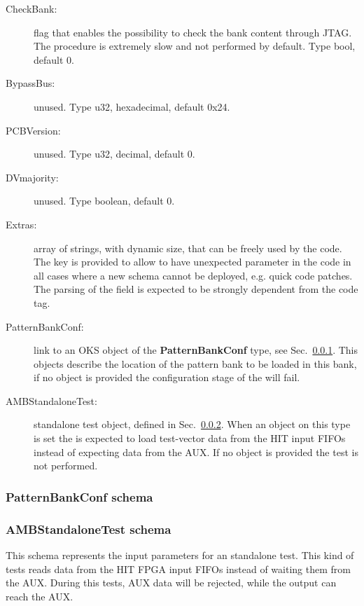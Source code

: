 \begin{description}
\item[CheckBank:] flag that enables the possibility to check the bank content
through JTAG. The procedure is extremely slow and not performed by default.
Type bool, default 0.

\item[BypassBus:] unused. Type u32, hexadecimal, default 0x24.

\item[PCBVersion:] unused. Type u32, decimal, default 0.

\item[DVmajority:] unused. Type boolean, default 0.

\item[Extras:] array of strings, with dynamic size, that can be freely used by the code.
The key is provided to allow to have unexpected parameter in the code in all cases
where a new schema cannot be deployed, e.g. quick code patches. The parsing of the
field is expected to be strongly dependent from the code tag.

\item[PatternBankConf:] link to an OKS object of the \textbf{PatternBankConf} type,
see Sec.~\ref{sec:pattbankschema}. This objects describe the location of the pattern
bank to be loaded in this bank, if no object is provided the configuration stage
of the \RCModule will fail.

\item[AMBStandaloneTest:] standalone test object, defined in Sec.~\ref{sec:ambtestschema}.
When an object on this type is set the \AMBoard is expected to load test-vector
data from the HIT input FIFOs instead of expecting data from the AUX. If no
object is provided the test is not performed.
\end{description}


\subsubsection{PatternBankConf schema}
\label{sec:pattbankschema}

\subsubsection{AMBStandaloneTest schema}
\label{sec:ambtestschema}

This schema represents the input parameters for an \AMBoard standalone test.
This kind of tests reads data from the HIT FPGA input FIFOs instead of waiting
them from the AUX. During this tests, AUX data will be rejected, while the
output can reach the AUX.

